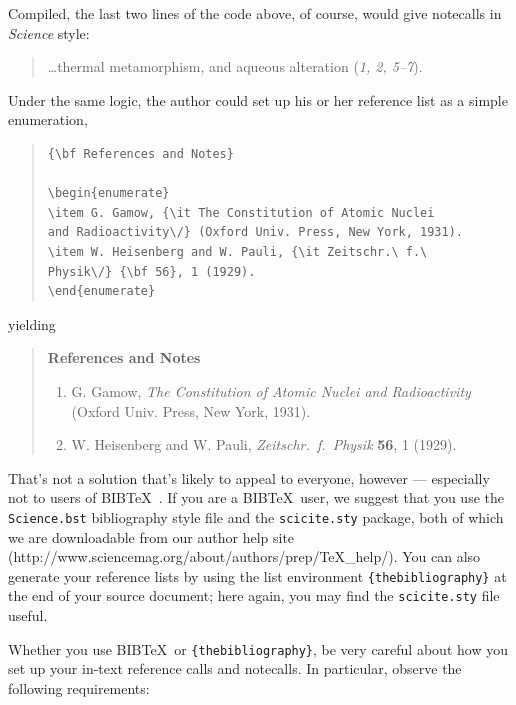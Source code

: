 \documentclass[12pt]{article}
\begin{document}
\noindent Compiled, the last two lines of the code above, of course, would give notecalls in {\it Science\/} style:

\begin{quote}
\ldots thermal metamorphism, and aqueous alteration ({\it 1, 2, 5--7\/}).
\end{quote}

Under the same logic, the author could set up his or her reference list as a simple enumeration,

\begin{quote}
\begin{verbatim}
{\bf References and Notes}

\begin{enumerate}
\item G. Gamow, {\it The Constitution of Atomic Nuclei
and Radioactivity\/} (Oxford Univ. Press, New York, 1931).
\item W. Heisenberg and W. Pauli, {\it Zeitschr.\ f.\ 
Physik\/} {\bf 56}, 1 (1929).
\end{enumerate}
\end{verbatim}
\end{quote}

\noindent yielding

\begin{quote}
{\bf References and Notes}

\begin{enumerate}
\item G. Gamow, {\it The Constitution of Atomic Nuclei and
Radioactivity\/} (Oxford Univ. Press, New York, 1931).
\item W. Heisenberg and W. Pauli, {\it Zeitschr.\ f.\ Physik} {\bf 56},
1 (1929).
\end{enumerate}
\end{quote}

That's not a solution that's likely to appeal to everyone, however ---
especially not to users of B{\small{IB}}\TeX\ \cite{inclme}.  If you
are a B{\small{IB}}\TeX\ user, we suggest that you use the
\texttt{Science.bst} bibliography style file and the
\texttt{scicite.sty} package, both of which we are downloadable from our author help site
(http://www.sciencemag.org/about/authors/prep/TeX\_help/).  You can also
generate your reference lists by using the list environment
\texttt{\{thebibliography\}} at the end of your source document; here
again, you may find the \texttt{scicite.sty} file useful.

Whether you use B{\small{IB}}\TeX\ or \texttt{\{thebibliography\}}, be
very careful about how you set up your in-text reference calls and
notecalls.  In particular, observe the following requirements:
\end{document}
